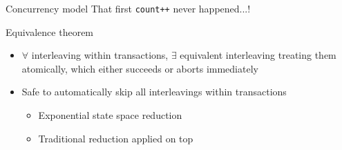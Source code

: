 \documentclass[xcolor=dvipsnames]{beamer}
\begin{document}
\begin{frame}{Concurrency model}
	That first {\tt count++} never happened...!
	\linegap


	Equivalence theorem
	\begin{itemize}
		\item $\forall$ interleaving within transactions, $\exists$ equivalent interleaving
			treating them atomically, which either succeeds or aborts immediately
		\item Safe to automatically skip all interleavings within transactions %
			\begin{itemize}
				\item Exponential state space reduction
				\item Traditional reduction %
					applied on top
			\end{itemize}
	\end{itemize}
\end{frame}
\end{document}
